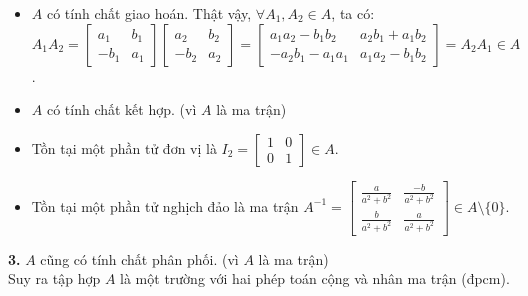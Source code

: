 \begin{itemize}[itemsep=-6pt, noitemsep, topsep=0pt]
    \item $A$ có tính chất giao hoán. Thật vậy, $\forall A_1, A_2 \in A$, ta có:\\[6pt]
    $A_1 A_2 = \begin{bmatrix}
    a_1 & b_1\\[-6pt]
    -b_1 & a_1
    \end{bmatrix} \begin{bmatrix}
    a_2 & b_2\\[-6pt]
    -b_2 & a_2\end{bmatrix} = \begin{bmatrix}
    a_1 a_2 - b_1 b_2 & a_2 b_1 + a_1 b_2\\[-6pt]
    - a_2 b_1 - a_1 a_1 & a_1 a_2 - b_1 b_2
    \end{bmatrix} = A_2 A_1 \in A$.\\[-12pt]
    \item $A$ có tính chất kết hợp. (vì $A$ là ma trận)\\[-12pt]
    \item Tồn tại một phần tử đơn vị là $I_2 = \begin{bmatrix} 
    1 & 0\\[-6pt]
    0 & 1\end{bmatrix} \in A$.
    \item Tồn tại một phần tử nghịch đảo là ma trận $A^{-1} = \begin{bmatrix}
\displaystyle \frac{a}{a^2 + b^2} & \displaystyle \frac{-b}{a^2 + b^2}\\[9pt]
\displaystyle \frac{b}{a^2 + b^2} & \displaystyle \frac{a}{a^2 + b^2} \end{bmatrix} \in A \setminus \{0\}$.
\end{itemize}
\textbf{3.} $A$ cũng có tính chất phân phối. (vì $A$ là ma trận)\\
Suy ra tập hợp $A$ là một trường với hai phép toán cộng và nhân ma trận (đpcm).

\clearpage